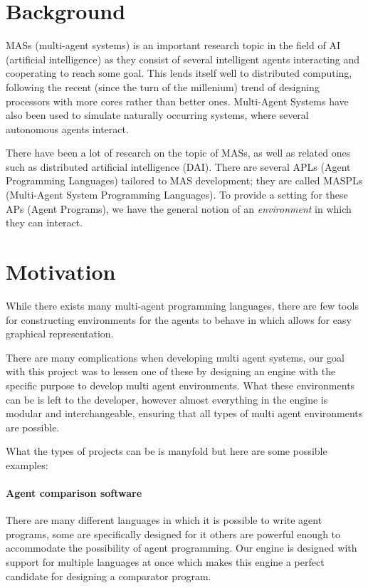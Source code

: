 
\section*{Background}

MASs (multi-agent systems) is an important research topic in the field
of AI (artificial intelligence) as they consist of several intelligent
agents interacting and cooperating to reach some goal. This lends
itself well to distributed computing, following the recent (since
the turn of the millenium) trend of designing processors with more
cores rather than better ones. Multi-Agent Systems have also been
used to simulate naturally occurring systems, where several autonomous
agents interact. 

There have been a lot of research on the topic of MASs, as well as
related ones such as distributed artificial intelligence (DAI). There
are several APLs (Agent Programming Languages) tailored to MAS development;
they are called MASPLs (Multi-Agent System Programming Languages).
To provide a setting for these APs (Agent Programs), we have the general
notion of an \emph{environment} in which they can interact. 


\section*{Motivation}

While there exists many multi-agent programming languages, there are
few tools for constructing environments for the agents to behave in
which allows for easy graphical representation. 

There are many complications when developing multi agent systems,
our goal with this project was to lessen one of these by designing
an engine with the specific purpose to develop multi agent environments.
What these environments can be is left to the developer, however almost
everything in the engine is modular and interchangeable, ensuring
that all types of multi agent environments are possible. 

What the types of projects can be is manyfold but here are some possible
examples:


\paragraph*{Agent comparison software}

There are many different languages in which it is possible to write
agent programs, some are specifically designed for it others are powerful
enough to accommodate the possibility of agent programming. Our engine
is designed with support for multiple languages at once which makes
this engine a perfect candidate for designing a comparator program. 

